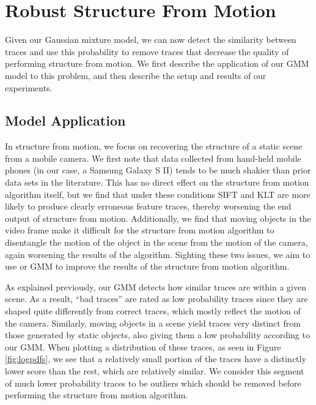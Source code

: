 \section{Robust Structure From Motion}
\label{sec:sfm}

Given our Gaussian mixture model, we can now detect the similarity between
traces and use this probability to remove traces that decrease the quality of
performing structure from motion.  We first describe the application of our GMM
model to this problem, and then describe the setup and results of our
experiments.

\subsection{Model Application} %
\label{sub:Model Application}

In structure from motion, we focus on recovering the structure of a
static scene from a mobile camera.  We first note that data
collected from hand-held mobile phones (in our case, a Samsung Galaxy S II)
tends to be much shakier than prior data sets in the literature.  
This has no direct effect on the structure from motion algorithm itself, but we find that 
under these conditions SIFT and KLT are more likely to produce clearly erroneous feature traces,
thereby worsening the end output of structure from motion.  Additionally, we find
that moving objects in the video frame make it difficult for
the structure from motion algorithm to disentangle the motion of the object in
the scene from the motion of the camera, again worsening the results of the
algorithm.  Sighting these two issues, we aim to use or
GMM to improve the results of the structure from motion algorithm.

As explained previously, our GMM detects how similar traces are within a given
scene.  As a result, ``bad traces'' are rated as low probability traces since they 
are shaped quite differently from correct traces, which mostly reflect the motion of 
the camera.  Similarly, moving objects in a scene yield traces very distinct from 
those generated by static objects, also giving them a low probability according to our GMM.  When plotting a
distribution of these traces, as seen in Figure \ref{fig:logpdfs}, we see that
a relatively small portion of the traces have a distinctly lower score than
the rest, which are relatively similar.  We consider this
segment of much lower probability traces to be outliers which should be
removed before performing the structure from motion algorithm.

